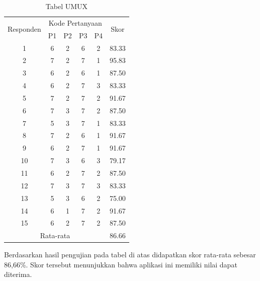 \begin{table}[H]
	\begin{center}
	\caption{Tabel UMUX}
	\label{tab:UMUX}
	\begin{tabular}{|c|c|c|c|c|c|}
	\hline
	\multirow{2}{*}{Responden}&\multicolumn{4}{c|}{Kode Pertanyaan}&\multirow{2}{*}{Skor}\\
	\cline{2-5}
	&P1&P2&P3&P4&\\
	\hline
	1&6&2&6&2&83.33\\
	\hline
	2&7&2&7&1&95.83\\
	\hline
	3&6&2&6&1&87.50\\
	\hline
	4&6&2&7&3&83.33\\
	\hline
	5&7&2&7&2&91.67\\
	\hline
	6&7&3&7&2&87.50\\
	\hline
	7&5&3&7&1&83.33\\
	\hline
	8&7&2&6&1&91.67\\
	\hline
	9&6&2&7&1&91.67\\
	\hline
	10&7&3&6&3&79.17\\
	\hline
	11&6&2&7&2&87.50\\
	\hline
	12&7&3&7&3&83.33\\
	\hline
	13&5&3&6&2&75.00\\
	\hline
	14&6&1&7&2&91.67\\
	\hline
	15&6&2&7&2&87.50\\
	\hline
	\multicolumn{5}{|c|}{Rata-rata}&86.66\\
	\hline
	\end{tabular}
	\end{center}
\end{table}

\par Berdasarkan hasil pengujian pada tabel di atas didapatkan skor rata-rata sebesar 86,66\%. Skor tersebut menunjukkan bahwa aplikasi ini memiliki nilai dapat diterima.


